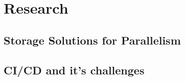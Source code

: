 \section{Research}
  \subsection{Storage Solutions for Parallelism}
  \label{sec:storageSolutions}
  
  \subsection{CI/CD and it's challenges}

\newpage